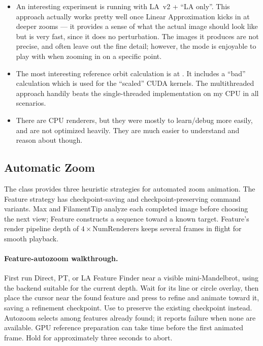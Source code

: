 \begin{itemize}
\item An interesting experiment is running with LA~v2 + ``LA only''. This
approach actually works pretty well once Linear Approximation kicks in at
deeper zooms --- it provides a sense of what the actual image should look like
but is very fast, since it does no perturbation. The images it produces are not
precise, and often leave out the fine detail; however, the mode is enjoyable to play with
when zooming in on a specific point.

\item The most interesting reference orbit calculation is at
. It includes a ``bad'' calculation
which is used for the ``scaled'' CUDA kernels. The multithreaded approach
handily beats the single-threaded implementation on my CPU in all scenarios.

\item There are CPU renderers, but they were mostly to learn/debug more easily,
and are not optimized heavily. They are much easier to understand and reason
about though.
\end{itemize}

\subsection{Automatic Zoom}
\label{subsec:autozoom}

The  class provides three heuristic strategies for
automated zoom animation.  The Feature strategy has checkpoint-saving and
checkpoint-preserving command variants. Max and FilamentTip analyze each
completed image before choosing the next view; Feature constructs a sequence
toward a known target. Feature's render pipeline depth of
$4 \times \text{NumRenderers}$ keeps several frames in flight for smooth playback.

\paragraph{Feature-autozoom walkthrough.}
First run Direct, PT, or LA Feature Finder near a visible mini-Mandelbrot,
using the backend suitable for the current depth. Wait for its line or circle
overlay, then place the cursor near the found feature and press 
to refine and animate toward it, saving a refinement checkpoint. Use
 to preserve the existing checkpoint instead. Autozoom selects
among features already found; it reports failure when none are available.
GPU reference preparation can take time before the first animated frame.
Hold  for approximately three seconds to abort.

